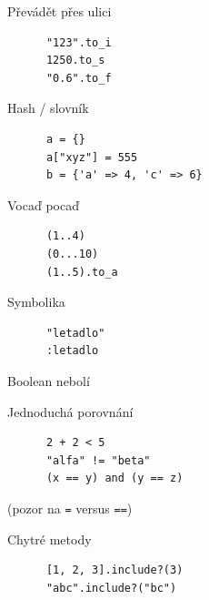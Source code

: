 \documentclass{beamer}
\begin{document}
\begin{frame}[fragile]{}
  \begin{block}{Převádět přes ulici}
    \begin{verbatim}
      "123".to_i
      1250.to_s
      "0.6".to_f
    \end{verbatim}
  \end{block}
  \pause
  \begin{block}{Hash / slovník}
    \begin{verbatim}
      a = {}
      a["xyz"] = 555
      b = {'a' => 4, 'c' => 6}
    \end{verbatim}
  \end{block}
\end{frame}

\begin{frame}[fragile]{}
  \begin{block}{Vocaď pocaď}
    \begin{verbatim}
      (1..4)
      (0...10)
      (1..5).to_a
    \end{verbatim}
  \end{block}
  \pause
  \begin{block}{Symbolika}
    \begin{verbatim}
      "letadlo"
      :letadlo
    \end{verbatim}
  \end{block}
\end{frame}

\begin{frame}[fragile]{Boolean nebolí}
  \begin{block}{Jednoduchá porovnání}
    \begin{verbatim}
      2 + 2 < 5
      "alfa" != "beta"
      (x == y) and (y == z)
    \end{verbatim}
  \end{block}
  (pozor na \texttt{=} versus \texttt{==})
  \pause
  \begin{block}{Chytré metody}
    \begin{verbatim}
      [1, 2, 3].include?(3)
      "abc".include?("bc")
    \end{verbatim}
  \end{block}
\end{frame}
\end{document}
